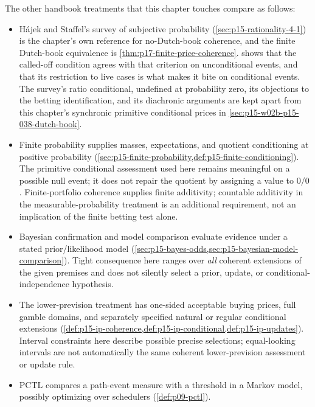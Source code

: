 The other handbook treatments that this chapter touches compare as follows:
\begin{itemize}
\item H\'ajek and Staffel's survey of subjective probability
      (\cref{sec:p15-rationality-4-1}) is the chapter's own reference
      for no-Dutch-book coherence, and the finite Dutch-book
      equivalence is \cref{thm:p17-finite-price-coherence}.
       shows that the
      called-off condition agrees with that criterion on unconditional
      events, and that its restriction to live cases is what makes it
      bite on conditional events. The survey's ratio conditional,
      undefined at probability zero, its objections to the betting
      identification, and its diachronic arguments are kept apart from
      this chapter's synchronic primitive conditional prices in
      \cref{sec:p15-w02b-p15-038-dutch-book}.
\item Finite probability supplies masses, expectations, and quotient
      conditioning at positive probability
      (\cref{sec:p15-finite-probability,def:p15-finite-conditioning}).
      The primitive conditional assessment used here remains meaningful
      on a possible null event; it does not repair the quotient by
      assigning a value to \(0/0\). Finite-portfolio coherence supplies
      finite additivity; countable additivity in the measurable-probability
      treatment is an additional requirement, not an implication of
      the finite betting test alone.
\item Bayesian confirmation and model comparison evaluate evidence
      under a stated prior/likelihood model
      (\cref{sec:p15-bayes-odds,sec:p15-bayesian-model-comparison}).
      Tight consequence here ranges over \emph{all} coherent extensions
      of the given premises and does not silently select a prior,
      update, or conditional-independence hypothesis.
\item The lower-prevision treatment has one-sided acceptable buying
      prices, full gamble domains, and separately specified natural or
      regular conditional extensions
      (\cref{def:p15-ip-coherence,def:p15-ip-conditional,def:p15-ip-updates}).
      Interval constraints here describe possible precise selections;
      equal-looking intervals are not automatically the same coherent
      lower-prevision assessment or update rule.
\item PCTL compares a path-event measure with a threshold in a Markov
      model, possibly optimizing over schedulers (\cref{def:p09-pctl}).

\end{itemize}
